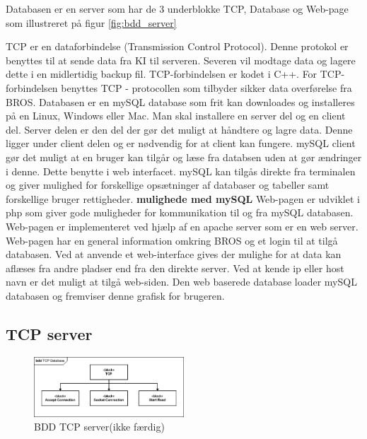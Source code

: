 Databasen er en server som har de 3 underblokke TCP, Database og Web-page som illustreret på figur \ref{fig:bdd_server}

TCP er en dataforbindelse (Transmission Control Protocol). Denne protokol er benyttes til at sende data fra KI til serveren. Severen vil modtage data og lagere dette i en midlertidig backup fil. TCP-forbindelsen er kodet i C++.
For TCP-forbindelsen benyttes TCP - protocollen som tilbyder sikker data overførelse fra BROS.
Databasen er en mySQL database som frit kan downloades og installeres på en Linux, Windows eller Mac.
Man skal installere en server del og en client del. Server delen er den del der gør det muligt at håndtere og lagre data. Denne ligger under client delen og er nødvendig for at client kan fungere. mySQL client gør det muligt at en bruger kan tilgår og læse fra databsen uden at gør ændringer i denne. Dette benytte i web interfacet. mySQL kan tilgås direkte fra terminalen og giver mulighed for forskellige opsætninger af databaser og tabeller samt forskellige bruger rettigheder.
\textbf{mulighede med mySQL}
Web-pagen er udviklet i php som giver gode muligheder for kommunikation til og fra mySQL databasen. Web-pagen er implementeret ved hjælp af en apache server som er en web server. Web-pagen har en general information omkring BROS og et login til at tilgå databasen. Ved at anvende et web-interface gives der mulighe for at data kan aflæses fra andre pladser end fra den direkte server. Ved at kende ip eller host navn er det muligt at tilgå web-siden.
Den web baserede database loader mySQL databasen og fremviser denne grafisk for brugeren.

\subsection{TCP server}
\begin{figure}[htbp]
	\centering
	\includegraphics[width=0.5\textwidth]{billeder/bdd_TCP_server}
	\caption{BDD TCP server(ikke færdig)}
	\label{fig:bdd_TCP_server}
\end{figure}




